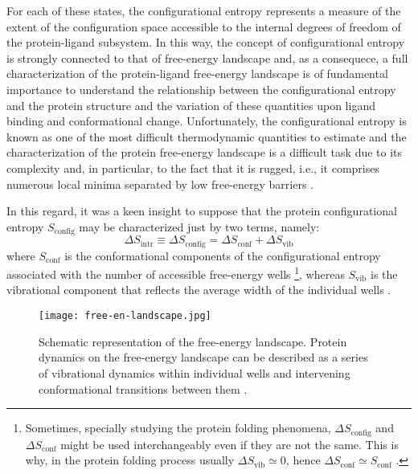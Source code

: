For each of these states, the configurational entropy represents a measure of the extent of the configuration space accessible to the internal degrees of freedom of the protein-ligand subsystem. In this way, the concept of configurational entropy is strongly connected to that of free-energy landscape and, as a consequece, a full characterization of the protein-ligand free-energy landscape is of fundamental importance to understand the relationship between the configurational entropy and the protein structure and the variation of these quantities upon ligand binding and conformational change. Unfortunately, the configurational entropy is known as one of the most difficult thermodynamic quantities to estimate and the characterization of the protein free-energy landscape is a difficult task due to its complexity and, in particular, to the fact that it is rugged, i.e., it comprises numerous local minima separated by low free-energy barriers \cite{chong2015dissecting}. 

In this regard, it was a keen insight to suppose that the protein configurational entropy $S_\text{config}$ may be characterized just by two terms, namely: 
\begin{equation*}
\label{entropy-variation:configurational}
\Delta S_\text{intr} \equiv \Delta S_\text{config} = \Delta S_\text{conf} + \Delta S_\text{vib}
\end{equation*}
where  $S_\text{conf}$ is the conformational components of the configurational entropy associated with the number of accessible free-energy wells \footnote{Sometimes, specially studying the protein folding phenomena, $\Delta S_\text{config}$ and  $\Delta S_\text{conf}$ might be used interchangeably even if they are not the same. This is why, in the protein folding process usually $\Delta S_\text{vib} \simeq 0$, hence $\Delta S_\text{conf} \simeq S_\text{conf}$ \cite{karplus1987configurational}.}, whereas $S_\text{vib}$ is the vibrational component that reflects the average width of the individual wells \cite{chong2015dissecting, karplus1987configurational}.%

\begin{figure}[h]
\centering
\begin{minipage}[t]{0.8\textwidth}
\centering
\texttt{[image: free-en-landscape.jpg]}

\caption{\small{Schematic representation of the free-energy landscape. Protein dynamics on the free-energy landscape can be described as a series of vibrational dynamics within individual wells and intervening conformational transitions between them \cite{chong2015dissecting}.}}

\label{fig:generation-of-microcan_state}
\end{minipage} 
\end{figure}

